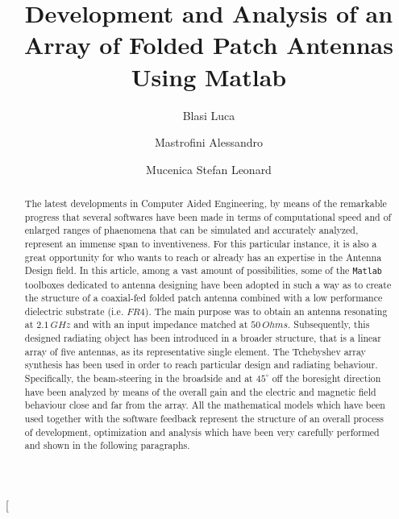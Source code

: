 \documentclass[10 pt,a4paper,twocolumn]{article}
\title{\vspace*{10 pt}\color{orange_work}\Huge\textbf{Development and Analysis of an Array of Folded Patch Antennas Using Matlab}\vspace*{1 pt}}
\author[]{Blasi Luca}
\author[2]{Mastrofini Alessandro}
\author[3]{Mucenica Stefan Leonard}
\affil[2]{alessandro.mastrofini@alumni.uniroma2.eu}
\affil[3]{stefanleonard.mucenica@alumni.uniroma2.eu}
\date{}
\begin{document}
{\selectfont







\twocolumn[{
\begin{@twocolumnfalse} 
		\vspace*{20 pt}
	\begingroup
	\let\center\flushleft
	\maketitle
	\let\endcenter\endflushleft
	\endgroup
	\begin{abstract}
The latest developments in Computer Aided Engineering, by means of the remarkable progress that several softwares have been made in terms of computational speed and of enlarged ranges of phaenomena that can be simulated and accurately analyzed, represent an immense span to inventiveness. For this particular instance, it is also a great opportunity for who wants to reach or already has an expertise in the Antenna Design field. In this article, among a vast amount of possibilities, some of the \texttt{Matlab} toolboxes dedicated to antenna designing have been adopted in such a way as to create the structure of a coaxial-fed folded patch antenna combined with a low performance dielectric substrate (i.e. $FR4$). The main purpose was to obtain an antenna resonating at $2.1\,GHz$ and with an input impedance matched at $50\,Ohms$. Subsequently, this designed radiating object has been introduced in a broader structure, that is a linear array of five antennas, as its representative single element. The Tchebyshev array synthesis has been used in order to reach particular design and radiating behaviour. Specifically, the beam-steering in the broadside and at $45^\circ$ off the boresight direction have been analyzed by means of the overall gain and the electric and magnetic field behaviour close and far from the array. All the mathematical models which have been used together with the software feedback represent the structure of an overall process of development, optimization and analysis which have been very carefully performed and shown in the following paragraphs. 



\end{abstract}
\end{@twocolumnfalse}}}
\end{document}
